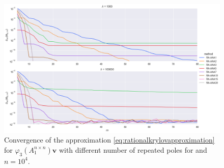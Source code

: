 \begin{figure}[h]
    \centering
    \includegraphics[width=.9\textwidth]{img/krylovapproximation/cnvg_poles_n1e04_p03.png}
    \caption{
        Convergence of the approximation \eqref{eq:rationalkrylovapproximation}
        for $\varphi_3(A_1^{n \times n})\mathbf{v}$ with different number of repeated poles for and $n=10^4$.
    }
    \label{fig:rationalkrylovpoleselection}
\end{figure}

